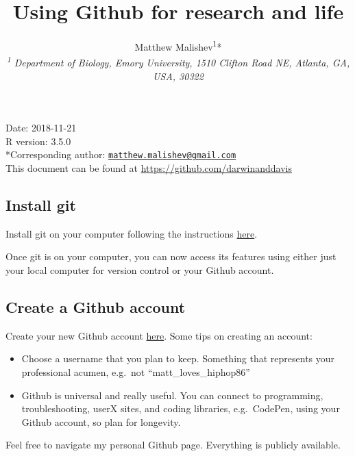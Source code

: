 \documentclass[10,portrait]{article}
\title{Using Github for research and life}
\author{Matthew
Malishev\textsuperscript{1}*\\[2\baselineskip]\emph{\textsuperscript{1}
Department of Biology, Emory University, 1510 Clifton Road NE, Atlanta,
GA, USA, 30322}}
\date{}
\providecommand{\tightlist}{%
  \setlength{\itemsep}{0pt}\setlength{\parskip}{0pt}}
\begin{document}
\maketitle

{
\hypersetup{linkcolor=black}
\setcounter{tocdepth}{4}
\tableofcontents
}
\newpage   

Date: 2018-11-21\\
R version: 3.5.0\\
*Corresponding author:
\href{mailto:matthew.malishev@gmail.com}{\nolinkurl{matthew.malishev@gmail.com}}\\
This document can be found at \url{https://github.com/darwinanddavis}\\
\newpage  

\subsection{Install git}\label{install-git}

Install git on your computer following the instructions
\href{https://git-scm.com/book/en/v2/Getting-Started-Installing-Git}{here}.

Once git is on your computer, you can now access its features using
either just your local computer for version control or your Github
account.

\subsection{Create a Github account}\label{create-a-github-account}

Create your new Github account \href{https://github.com/}{here}. Some
tips on creating an account:

\begin{itemize}
\tightlist
\item
  Choose a username that you plan to keep. Something that represents
  your professional acumen, e.g.~not ``matt\_loves\_hiphop86''\\
  \hspace*{0.333em}
\item
  Github is universal and really useful. You can connect to programming,
  troubleshooting, userX sites, and coding libraries, e.g.~CodePen,
  using your Github account, so plan for longevity.\\
  \hspace*{0.333em}
\end{itemize}

Feel free to navigate my personal Github page. Everything is publicly
available.
\end{document}
